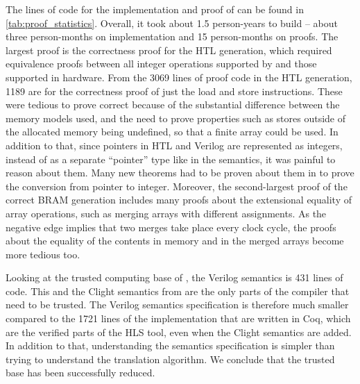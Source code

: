The lines of code for the implementation and proof of \vericert{} can be found
in \cref{tab:proof_statistics}.  Overall, it took about 1.5 person-years to
build \vericert{} -- about three person-months on implementation and 15
person-months on proofs.  The largest proof is the correctness proof for the HTL
generation, which required equivalence proofs between all integer operations
supported by \compcert{} and those supported in hardware.  From the 3069 lines
of proof code in the HTL generation, 1189 are for the correctness proof of just
the load and store instructions.  These were tedious to prove correct because of
the substantial difference between the memory models used, and the need to prove
properties such as stores outside of the allocated memory being undefined, so
that a finite array could be used. In addition to that, since pointers in HTL
and Verilog are represented as integers, instead of as a separate
\enquote{pointer} type like in the \compcert{} semantics, it was painful to
reason about them.  Many new theorems had to be proven about them in \vericert{}
to prove the conversion from pointer to integer.  Moreover, the second-largest
proof of the correct \gls{BRAM} generation includes many proofs about the
extensional equality of array operations, such as merging arrays with different
assignments.  As the negative edge implies that two merges take place every
clock cycle, the proofs about the equality of the contents in memory and in the
merged arrays become more tedious too.

Looking at the trusted computing base of \vericert{}, the Verilog semantics is
431 lines of code.  This and the Clight semantics from \compcert{} are the only
parts of the compiler that need to be trusted.  The Verilog semantics
specification is therefore much smaller compared to the 1721 lines of the
implementation that are written in Coq, which are the verified parts of the HLS
tool, even when the Clight semantics are added.  In addition to that,
understanding the semantics specification is simpler than trying to understand
the translation algorithm. We conclude that the trusted base has been
successfully reduced.

